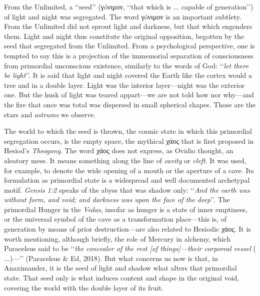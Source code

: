 \documentclass[a4paper]{article}
\begin{document}
From the Unlimited, a \lq\lq seed\rq\rq{} (γóνιμον, \lq\lq that which is $\ldots$
capable of generation\rq\rq{}) of light and night was segregated. The word
γóνιμον is an important subtlety. From the Unlimited did not sprout light and
darkness, but that which engenders them. Light and night thus
constitute the original opposition, begotten by the seed that segregated from
the Unlimited. From a psychological perspective, one is tempted to say this is a
projection of the immemorial separation of consciousness from primordial
unconscious existence, similarly to the words of God: \lq\lq \textit{let there be
light}\rq\rq{}. It is said that light and night covered the Earth like the cortex
would a tree and in a double layer. Light was the interior layer---night was the
exterior one. But the husk of light was teared appart---we are not told how nor
why---and the fire that once was total was dispersed in small spherical shapes.
Those are the stars and \textit{astrums} we observe.

The world to which the seed is thrown, the cosmic state in which this primordial
segregation occurs, is the empty space, the mythical χάος that is first proposed
in Hesiod's \textit{Theogony}. The word χάος does not express, as Ovidio
thought, an aleatory mess. It means something along the line of \textit{cavity}
or \textit{cleft}. It was used, for example, to denote the wide opening of a
mouth or the aperture of a cave. Its formulation as primordial state is a
widespread and well documented archetypal motif. \textit{Gensis 1:2} speaks of
the abyss that was shadow only: \lq\lq \textit{And the earth was without form, and void;
and darkness was upon the face of the deep}\rq\rq. The primordial Hunger in the
\textit{Vedas}, insofar as hunger is a state of inner emptiness, or the
universal symbol of the cave as a transformation place---this is, of generation
by means of prior destruction---are also related to Hesiodic χάος. It is worth
mentioning, although briefly, the role of Mercury in alchemy, which
Paracelsus said to be \lq\lq \textit{the concealer of the rest [of things]---their
corporeal vessel} ($\ldots$)---\rq\rq{} (Paracelsus & Ed, 2018). But what
concerns us now is that, in Anaximander, it is the seed of light and shadow what
alters that primordial state. That seed only is what induces content and shape
in the original void, covering the world with the double layer of its fruit.
\end{document}
